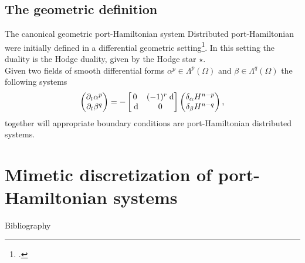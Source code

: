 \documentclass[aspectratio=169]{beamer}
\begin{document}
\subsection{The geometric definition}


\begin{frame}{The canonical geometric port-Hamiltonian system}
	Distributed port-Hamiltonian were initially defined in a differential geometric setting\footcite{vanderSchaft2002}. In this setting the duality is the Hodge duality, given by the Hodge star $\star$.\\
	
	Given two fields  of smooth differential forms $\alpha^p \in \Lambda^p(\Omega)$ and $\beta \in \Lambda^q(\Omega)$ the following systems
	\begin{equation*}
		\begin{pmatrix}
			\partial_t \alpha^p \\
			\partial_t \beta^q\\
		\end{pmatrix} = 
		-\begin{bmatrix}
			0 & (-1)^r\d \\
			\d & 0 \\
		\end{bmatrix}
		\begin{pmatrix}
			\delta_{\alpha} H^{n-p}\\
			\delta_{\beta} H^{n-q}\\
		\end{pmatrix},
	\end{equation*}
together will appropriate boundary conditions are port-Hamiltonian distributed systems.

\end{frame}


\section{Mimetic discretization of port-Hamiltonian systems}
	
\begin{frame}[allowframebreaks]{Bibliography}
	\printbibliography
\end{frame}

	\appendix
	
	
	
	
\end{document}
